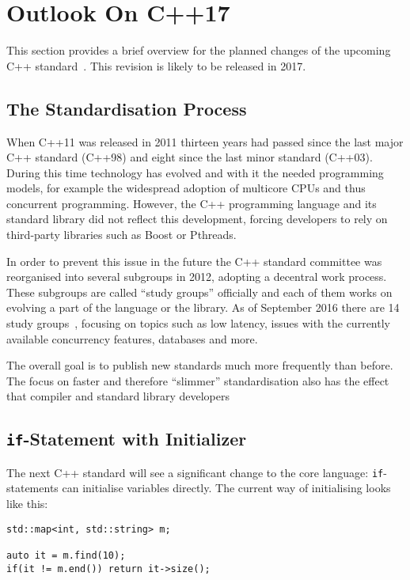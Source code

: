 \section{Outlook On C++17}\label{cpp17}

This section provides a brief overview for the planned changes of the upcoming C++ standard~\cite{cpp17std}. This revision is likely to be released in 2017.

\subsection{The Standardisation Process}\label{cpp17:standardisation}

When C++11 was released in 2011 thirteen years had passed since the last major C++ standard (C++98) and eight since the last minor standard (C++03). During this time technology has evolved and with it the needed programming models, for example the widespread adoption of multicore CPUs and thus concurrent programming. However, the C++ programming language and its standard library did not reflect this development, forcing developers to rely on third-party libraries such as Boost or Pthreads.

In order to prevent this issue in the future the C++ standard committee was reorganised into several subgroups in 2012, adopting a decentral work process. These subgroups are called ``study groups'' officially and each of them works on evolving a part of the language or the library. As of September 2016 there are 14 study groups~\cite{cpp_committee}, focusing on topics such as low latency, issues with the currently available concurrency features, databases and more.

The overall goal is to publish new standards much more frequently than before. The focus on faster and therefore ``slimmer'' standardisation also has the effect that compiler and standard library developers 

\subsection{\texttt{if}-Statement with Initializer}\label{cpp17:if_init}

The next C++ standard will see a significant change to the core language: \texttt{if}-statements can initialise variables directly. The current way of initialising looks like this:

\begin{verbatim}
std::map<int, std::string> m;

auto it = m.find(10);
if(it != m.end()) return it->size();
\end{verbatim}

